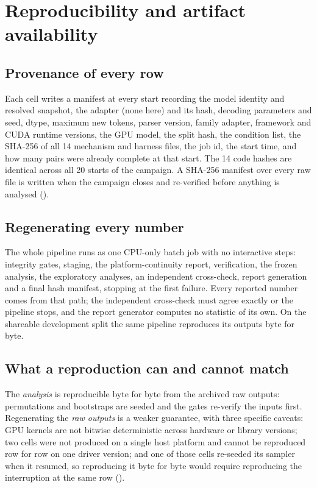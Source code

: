 \section{Reproducibility and artifact availability}
\label{sec:reproducibility}



\subsection{Provenance of every row}

Each cell writes a manifest at every start recording the model identity and resolved snapshot, the adapter (none
here) and its hash, decoding parameters and seed, dtype, maximum new tokens, parser version, family adapter,
framework and CUDA runtime versions, the GPU model, the split hash, the condition list, the SHA-256 of all 14
mechanism and harness files, the job id, the start time, and how many pairs were already complete at that start.
The 14 code hashes are identical across all 20 starts of the campaign. A SHA-256 manifest over every raw file is
written when the campaign closes and re-verified before anything is analysed ().

\subsection{Regenerating every number}

The whole pipeline runs as one CPU-only batch job with no interactive steps: integrity gates, staging, the
platform-continuity report, verification, the frozen analysis, the exploratory analyses, an independent
cross-check, report generation and a final hash manifest, stopping at the first failure. Every reported number
comes from that path; the independent cross-check must agree exactly or the pipeline stops, and the report
generator computes no statistic of its own. On the shareable development split the same pipeline reproduces its
outputs byte for byte.

\subsection{What a reproduction can and cannot match}

The \emph{analysis} is reproducible byte for byte from the archived raw outputs: permutations and bootstraps are
seeded and the gates re-verify the inputs first. Regenerating the \emph{raw outputs} is a weaker guarantee, with
three specific caveats: GPU kernels are not bitwise deterministic across hardware or library versions; two cells
were not produced on a single host platform and cannot be reproduced row for row on one driver version; and one of
those cells re-seeded its sampler when it resumed, so reproducing it byte for byte would require reproducing the
interruption at the same row ().

